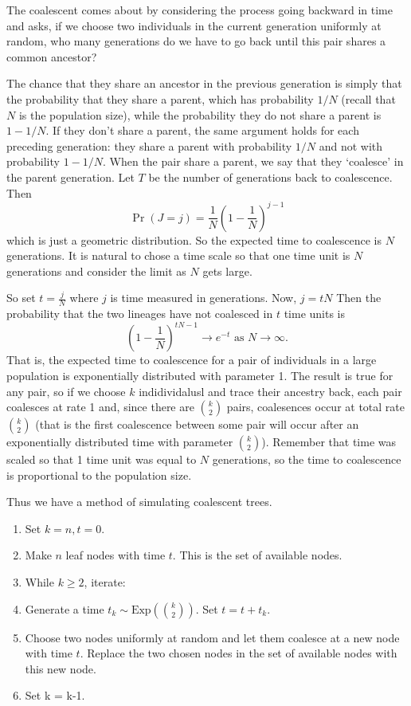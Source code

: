 \documentclass[11pt]{article}
\begin{document}
 The coalescent comes about by considering the process going backward in time and asks, if we choose two individuals in the current generation uniformly at random, who many generations do we have to go back until this pair shares a common ancestor?
 
The chance that they share an ancestor in the previous generation is simply that the probability that they share a parent, which has probability $1/N$ (recall that $N$ is the population size), while the probability they do not share a parent is $1- 1/N$.  If they don't share a parent, the same argument holds for each preceding generation: they share a parent with probability $1/N$ and not with probability $1-1/N$.  When the pair share a parent, we say that they `coalesce' in the parent generation. Let $T$ be the number of generations back to coalescence.  Then
\[ \Pr(J = j) = \frac 1N \left(1-\frac 1N \right)^{j-1}\]
which is just a geometric distribution.  So the expected time to coalescence is $N$ generations.  It is natural to chose a time scale so that one time unit is $N$ generations and consider the limit as $N$ gets large.  

So set $t = \frac j N$ where $j$ is time measured in generations.  Now, $j = tN$
Then the probability that the two lineages have not coalesced in $t$ time units is 
\[ \left(1-\frac1N \right)^{tN -1} \longrightarrow e^{-t} \mbox{ as } N \rightarrow \infty. \]
That is, the expected time to coalescence for a pair of individuals in a large population is exponentially distributed with parameter 1.  The result is true for any pair, so if we choose $k$ indidividalusl and trace their ancestry back, each pair coalesces at rate 1 and, since there are ${k \choose 2}$ pairs, coalesences occur at total rate  ${k \choose 2}$ (that is the first coalescence between some pair will occur after an exponentially distributed time with parameter ${k \choose 2}$).  Remember that time was scaled so that 1 time unit was equal to $N$ generations, so the time to coalescence is proportional to the population size.

Thus we have a method of simulating coalescent trees.
\begin{enumerate}
\item Set $k = n, t = 0$.  
\item Make $n$ leaf nodes with time $t$.  This is the set of available nodes.
\item While $k \geq 2$, iterate:
\item Generate a time $t_k \sim \mbox{Exp}( {k \choose 2})$. Set $t = t + t_k$.
\item Choose two nodes uniformly at random  and let them coalesce at a new node with time $t$. Replace the two chosen nodes in the set of available nodes with this new node.
\item Set k = k-1.
\end{enumerate}
\end{document}
